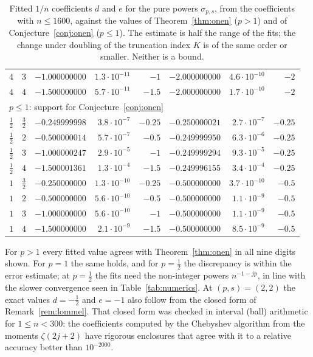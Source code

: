 \begin{table}[ht]
\begin{tabular}{rrrrrrrr}
$4$ & $3$ & $-1.000000000$ & $1.3\cdot10^{-11}$ & $-1$ & $-2.000000000$ & $4.6\cdot10^{-10}$ & $-2$\\
$4$ & $4$ & $-1.500000000$ & $5.7\cdot10^{-11}$ & $-1.5$ & $-2.000000000$ & $1.7\cdot10^{-10}$ & $-2$\\
\midrule
\multicolumn{8}{l}{$p\le1$: support for Conjecture~\ref{conj:onen}}\\
$\frac12$ & $\frac32$ & $-0.249999998$ & $3.8\cdot10^{-7}$ & $-0.25$ & $-0.250000021$ & $2.7\cdot10^{-7}$ & $-0.25$\\
$\frac12$ & $2$ & $-0.500000014$ & $5.7\cdot10^{-7}$ & $-0.5$ & $-0.249999950$ & $6.3\cdot10^{-6}$ & $-0.25$\\
$\frac12$ & $3$ & $-1.000000247$ & $2.9\cdot10^{-5}$ & $-1$ & $-0.249999294$ & $9.3\cdot10^{-5}$ & $-0.25$\\
$\frac12$ & $4$ & $-1.500001361$ & $1.3\cdot10^{-4}$ & $-1.5$ & $-0.249996155$ & $3.4\cdot10^{-4}$ & $-0.25$\\
$1$ & $\frac32$ & $-0.250000000$ & $1.3\cdot10^{-10}$ & $-0.25$ & $-0.500000000$ & $3.7\cdot10^{-10}$ & $-0.5$\\
$1$ & $2$ & $-0.500000000$ & $5.6\cdot10^{-10}$ & $-0.5$ & $-0.500000000$ & $1.1\cdot10^{-9}$ & $-0.5$\\
$1$ & $3$ & $-1.000000000$ & $5.6\cdot10^{-10}$ & $-1$ & $-0.500000000$ & $1.1\cdot10^{-9}$ & $-0.5$\\
$1$ & $4$ & $-1.500000000$ & $2.1\cdot10^{-9}$ & $-1.5$ & $-0.500000000$ & $8.5\cdot10^{-9}$ & $-0.5$\\
\bottomrule
\end{tabular}
\caption{Fitted $1/n$ coefficients $d$ and $e$ for the pure powers $\sigma_{p,s}$, from the coefficients with
$n\le1600$, against the values of Theorem~\ref{thm:onen} ($p>1$) and of Conjecture~\ref{conj:onen} ($p\le1$). The
estimate is half the range of the fits; the change under doubling of the truncation index $K$ is of the same order or
smaller. Neither is a bound.}
\label{tab:onen}
\end{table}

For $p>1$ every fitted value agrees with Theorem~\ref{thm:onen} in all nine digits shown. For $p=1$ the same holds, and
for $p=\frac12$ the discrepancy is within the error estimate; at $p=\frac12$ the fits need the non-integer powers
$n^{-1-jp}$, in line with the slower convergence seen in Table~\ref{tab:numerics}. At $(p,s)=(2,2)$ the exact values
$d=-\frac12$ and $e=-1$ also follow from the closed form of Remark~\ref{rem:lommel}. That closed form was checked in
interval (ball) arithmetic for $1\le n<300$: the coefficients computed by the Chebyshev algorithm from the moments
$\zeta(2j+2)$ have rigorous enclosures that agree with it to a relative accuracy better than $10^{-2000}$.
